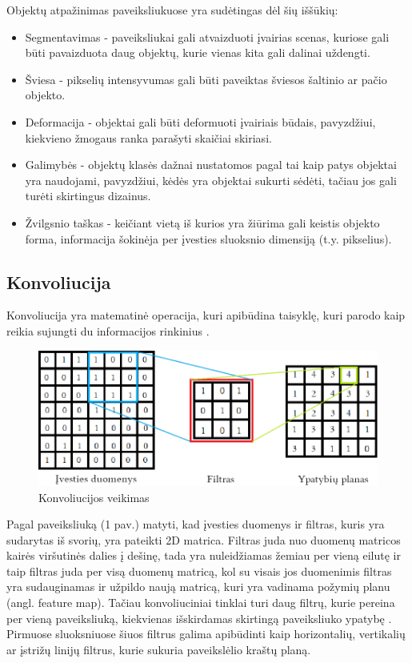 \documentclass{VUMIFPSbakalaurinis}
\begin{document}
Objektų atpažinimas paveiksliukuose yra sudėtingas dėl šių iššūkių:
\begin{itemize}
\item Segmentavimas - paveiksliukai gali atvaizduoti įvairias scenas, kuriose gali būti pavaizduota daug objektų, kurie vienas kita gali dalinai uždengti.
\item Šviesa - pikselių intensyvumas gali būti paveiktas šviesos šaltinio ar pačio objekto.
\item Deformacija - objektai gali būti deformuoti įvairiais būdais, pavyzdžiui, kiekvieno žmogaus ranka parašyti skaičiai skiriasi.
\item Galimybės - objektų klasės dažnai nustatomos pagal tai kaip patys objektai yra naudojami, pavyzdžiui, kėdės yra objektai sukurti sėdėti, tačiau jos gali turėti skirtingus dizainus.
\item Žvilgsnio taškas - keičiant vietą iš kurios yra žiūrima gali keistis objekto forma, informacija šokinėja per įvesties sluoksnio dimensiją (t.y. pikselius). 
\end{itemize}

\subsection{Konvoliucija}
Konvoliucija yra matematinė operacija, kuri apibūdina taisyklę, kuri parodo kaip reikia sujungti du informacijos rinkinius \cite{Convolution-book}. 

\begin{figure}[h]
    \centering
    \includegraphics[width=1\textwidth]{img/matrica.png}
    \caption{Konvoliucijos veikimas}
\end{figure}

Pagal paveiksliuką (1 pav.) matyti, kad įvesties duomenys ir filtras, kuris yra sudarytas iš svorių, yra pateikti 2D matrica. Filtras juda nuo duomenų matricos kairės viršutinės dalies į dešinę, 
tada yra nuleidžiamas žemiau per vieną eilutę ir taip filtras juda per visą duomenų matricą, kol su visais jos duomenimis filtras yra sudauginamas ir užpildo naują matricą, kuri 
yra vadinama požymių planu (angl. feature map).
Tačiau konvoliuciniai tinklai turi daug filtrų, kurie pereina per vieną paveiksliuką, kiekvienas išskirdamas skirtingą paveiksliuko ypatybę \cite{DBLP:journals/corr/abs-1708-08711}.
Pirmuose sluoksniuose šiuos filtrus galima apibūdinti kaip horizontalių, vertikalių ar įstrižų linijų filtrus, kurie sukuria paveikslėlio 
kraštų planą.
\end{document}
